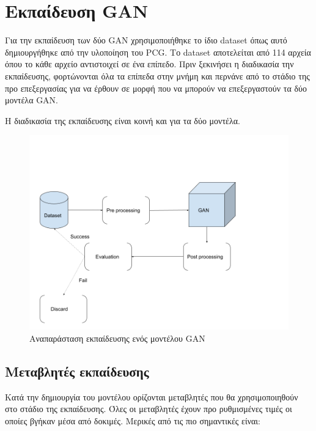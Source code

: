 \section{Εκπαίδευση GAN}
Για την εκπαίδευση των δύο GAN χρησιμοποιήθηκε το ίδιο dataset όπως αυτό δημιουργήθηκε από την υλοποίηση του PCG. Το dataset αποτελείται από 114 αρχεία όπου το κάθε αρχείο αντιστοιχεί σε ένα επίπεδο. Πριν ξεκινήσει η διαδικασία την εκπαίδευσης, φορτώνονται όλα τα επίπεδα στην μνήμη και περνάνε από το στάδιο της προ επεξεργασίας για να έρθουν σε μορφή που να μπορούν να επεξεργαστούν τα δύο μοντέλα GAN.
\par
Η διαδικασία της εκπαίδευσης είναι κοινή και για τα δύο μοντέλα.


\begin{figure}[H]
\centering
\includegraphics[width=.8\linewidth]{../images/graphs/Abstract_functionality.png}
\caption{Αναπαράσταση εκπαίδευσης ενός μοντέλου GAN}
\label{fig:fig}
\end{figure}

\subsection{Μεταβλητές εκπαίδευσης}
Κατά την δημιουργία του μοντέλου ορίζονται μεταβλητές που θα χρησιμοποιηθούν στο στάδιο της εκπαίδευσης. Όλες οι μεταβλητές έχουν προ ρυθμισμένες τιμές οι οποίες βγήκαν μέσα από δοκιμές. Μερικές από τις πιο σημαντικές είναι:

